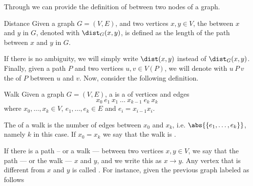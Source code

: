 \documentclass[a4paper, 12pt]{report}
\begin{document}
    Through  we can provide the definition of  between two nodes of a graph.

    \begin{frameddefn}{Distance}
        Given a graph $G = (V, E)$, and two vertices $x, y \in V$, the  between $x$ and $y$ in $G$, denoted with $\dist_G(x, y)$, is defined as the length of the  path between $x$ and $y$ in $G$.
    \end{frameddefn}

    If there is no ambiguity, we will simply write $\dist(x, y)$ instead of $\dist_G(x, y)$. Finally, given a path $P$ and two vertices $u, v \in V(P)$, we will denote with $u \ P \ v$ the  of $P$ between $u$ and $v$. Now, consider the following definition.

    \begin{frameddefn}{Walk}
        Given a graph $G = (V, E)$, a  is a  of vertices and edges $$x_0 \ e_1 \ x_1 \ \ldots \ x_{k - 1} \ e_k \ x_k$$ where $x_0, \ldots, x_k \in V$, $e_1, \ldots, e_k \in E$ and $e_i = x_{i - 1}x_i$.

        The  of a walk is the number of edges between $x_0$ and $x_k$, i.e. $\abs{\{e_1, \ldots , e_k \}}$, namely $k$ in this case. If $x_0 = x_k$ we say that the walk is .
    \end{frameddefn}

    If there is a path -- or a walk --- between two vertices $x, y \in V$, we say that the path --- or the walk ---  $x$ and $y$, and we write this as $x \to y$. Any vertex that is different from $x$ and $y$ is called . For instance, given the previous graph labeled as follows

    \begin{figure}[H]
        \centering
    \end{figure}
\end{document}
